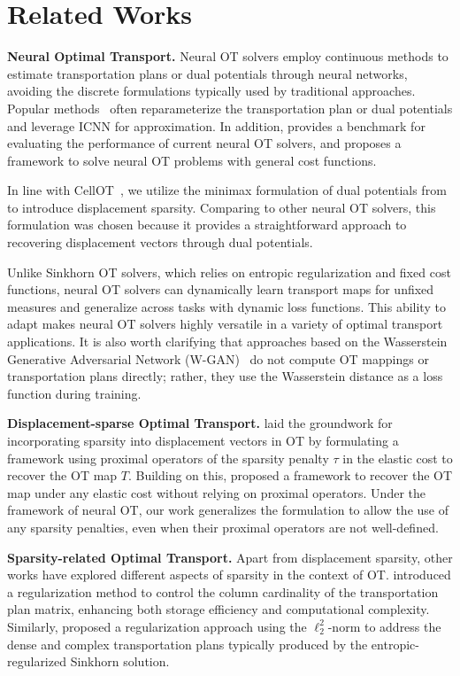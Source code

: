 \section{Related Works}
\textbf{Neural Optimal Transport. }Neural OT solvers employ continuous methods to estimate transportation plans or dual potentials through neural networks, avoiding the discrete formulations typically used by traditional approaches. Popular methods~\cite{taghvaei2019,Makkuva20,pmlr-v139-fan21d,korotin2021wasserstein,mokrov2021largescale,Bunne22,alvarez-melis2022optimizing} often reparameterize the transportation plan or dual potentials and leverage ICNN \cite{Amos17} for approximation. In addition, \citet{Korotin21} provides a benchmark for evaluating the performance of current neural OT solvers, and \citet{asadulaev2024neural} proposes a framework to solve neural OT problems with general cost functions.

In line with CellOT~\cite{Bunne23}, we utilize the minimax formulation of dual potentials from \citet{Makkuva20} to introduce displacement sparsity. Comparing to other neural OT solvers, this formulation was chosen because it provides a straightforward approach to recovering displacement vectors through dual potentials. 

Unlike Sinkhorn OT solvers, which relies on entropic regularization and fixed cost functions, neural OT solvers can dynamically learn transport maps for unfixed measures and generalize across tasks with dynamic loss functions. This ability to adapt makes neural OT solvers highly versatile in a variety of optimal transport applications. It is also worth clarifying that approaches based on the Wasserstein Generative Adversarial Network (W-GAN)~\cite{wgan,gulrajani2017improved,wei2018improving} do not compute OT mappings or transportation plans directly; rather, they use the Wasserstein distance as a loss function during training.

\textbf{Displacement-sparse Optimal Transport. }\citet{Cuturi23} laid the groundwork for incorporating sparsity into displacement vectors in OT by formulating a framework using proximal operators of the sparsity penalty \(\tau\) in the elastic cost to recover the OT map \(T\). Building on this, \citet{klein2024learning} proposed a framework to recover the OT map under any elastic cost without relying on proximal operators. Under the framework of neural OT, our work generalizes the formulation to allow the use of any sparsity penalties, even when their proximal operators are not well-defined.

\textbf{Sparsity-related Optimal Transport. }Apart from displacement sparsity, other works have explored different aspects of sparsity in the context of OT. \citet{liu2023sparsity} introduced a regularization method to control the column cardinality of the transportation plan matrix, enhancing both storage efficiency and computational complexity. Similarly, \citet{blondel18} proposed a regularization approach using the \(\ell^2_2\)-norm to address the dense and complex transportation plans typically produced by the entropic-regularized Sinkhorn solution.